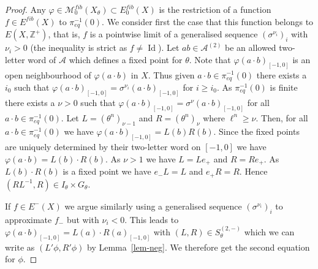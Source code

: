 \documentclass[10pt,a4paper]{amsart}
\numberwithin{equation}{section}
\newcommand{\Z}{\mathbb Z}
\DeclareMathOperator{\Id}{Id}
\newcommand{\Aa}{{\mathcal A}}
\newcommand{\pe}{\pi_{eq}}
\newcommand{\M}{\mathcal M}
\newcommand{\Ef}{E^{fib}}
\newcommand{\Sfib}{\M^{fib}_0(X_\theta)}
\begin{document}
\begin{proof} Any $\varphi\in \Sfib\subset \Ef_0(X)$ is the restriction of a function $f\in \Ef(X)$ to $\pe^{-1}(0)$. We consider first the case that this function belongs to $E(X,\Z^+)$,
that is, $f$ is a pointwise limit of a generalised sequence $(\sigma^{\nu_i})_i$ with $\nu_i> 0$ (the inequality is strict as $f\neq \Id$). Let $ab\in \mathcal A^{(2)}$ be an allowed two-letter word of $\Aa$ which defines a fixed point for $\theta$.  Note that $\varphi(a\cdot b)_{[-1,0]}$ is an open neighbourhood of $\varphi(a\cdot b)$ in $X$. Thus given $a\cdot b\in\pe^{-1}(0)$ there exists a 
$i_0$ such that $\varphi(a\cdot b)_{[-1,0]} = \sigma^{\nu_i}(a\cdot b)_{[-1,0]}$ for $i\geq i_0$. As $\pe^{-1}(0)$ is finite there exists a 
$\nu>0$ such that $\varphi(a\cdot b)_{[-1,0]} = \sigma^{\nu}(a\cdot b)_{[-1,0]}$  for all $a\cdot b\in\pe^{-1}(0)$. Let 
 $L=(\theta^n)_{\nu-1}$ and $R=(\theta^n)_{\nu}$ where $\ell^n\geq \nu$. Then, for all  $a\cdot b\in\pe^{-1}(0)$ we have $\varphi(a\cdot b)_{[-1,0]} = 
L(b) R(b)$. Since the fixed points are uniquely determined by their two-letter word on $[-1,0]$ we have $\varphi(a\cdot b) = L(b) \cdot R(b)$. 
As $\nu>1$ we have $L = Le_+$ and $R=R e_+$. As $L(b) \cdot R(b)$ is a fixed point we have $e_-L=L$ and $e_+R = R$. Hence $(RL^{-1},R)\in I_\theta\times G_\theta$. 


If $f \in E^-(X)$ we argue similarly using a generalised sequence $(\sigma^{\nu_i})_i$ to approximate $f_-$ but with $\nu_i<0$.  
This leads to  $\varphi(a\cdot b)_{[-1,0]} = L(a)\cdot R(a)_{[-1,0]}$ with $(L,R)\in S^{(2,-)}_\theta$ which we can write as $(L'\phi,R'\phi)$ by Lemma~\ref{lem-neg}. We therefore get the second equation for $\phi$.
\end{proof}


\end{document}
